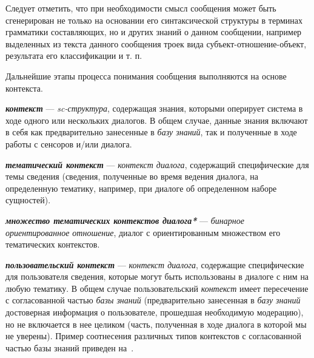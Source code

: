Следует отметить, что при необходимости смысл сообщения может быть сгенерирован не только на основании его синтаксической структуры в терминах грамматики составляющих, но и других знаний о данном сообщении, например выделенных из текста данного сообщения троек вида субъект-отношение-объект, результата его классификации и т. п.

Дальнейшие этапы процесса понимания сообщения выполняются на основе контекста.

\textbf{\textit{контекст}} --- \textit{sc-структура}, содержащая знания, которыми оперирует система в ходе одного или нескольких диалогов.
В общем случае, данные знания включают в себя как предварительно занесенные в \textit{базу знаний}, так и полученные в ходе работы с сенсоров и/или диалога.

\begin{SCn}

    \begin{scnindent}
        \begin{scneqtoset}
        \end{scneqtoset}
    \end{scnindent}

\end{SCn}

\textbf{\textit{тематический контекст}} --- \textit{контекст диалога}, содержащий специфические для темы сведения (сведения, полученные во время ведения диалога, на определенную тематику, например, при диалоге об определенном наборе сущностей).

\textbf{\textit{множество тематических контекстов диалога*}} --- \textit{бинарное ориентированное отношение}, диалог с ориентированным множеством его тематических контекстов.

\textbf{\textit{пользовательский контекст}} --- \textit{контекст диалога}, содержащие специфические для пользователя сведения, которые могут быть использованы в диалоге с ним на любую тематику.
В общем случае пользовательский \textit{контекст} имеет пересечение с согласованной частью \textit{базы знаний} (предварительно занесенная в \textit{базу знаний} достоверная информация о пользователе, прошедшая необходимую модерацию), но не включается в нее целиком (часть, полученная в ходе диалога в которой мы не уверены).
Пример соотнесения различных типов контекстов с согласованной частью базы знаний приведен на~\textit{}.

